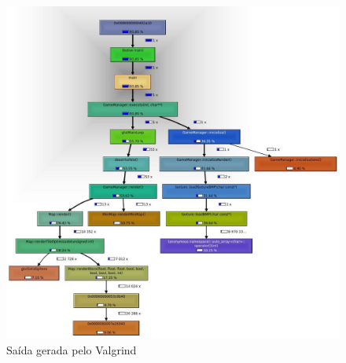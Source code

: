 \begin{figure}[h]
	\centering
	\includegraphics [scale=0.5,angle=0,keepaspectratio=true]{./fts/callgrind/img3}
	\caption{Saída gerada pelo Valgrind}
	\label{valgrind}
\end{figure}






